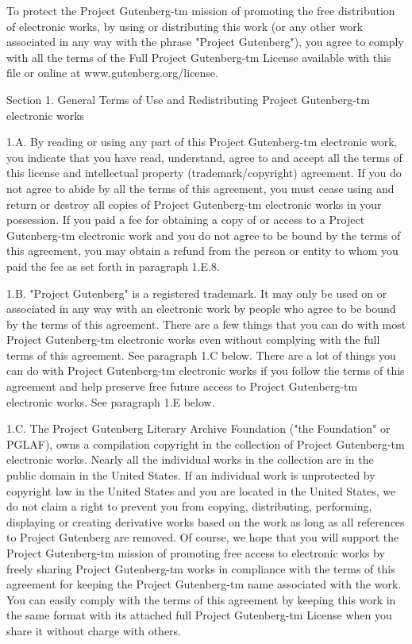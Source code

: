 To protect the Project Gutenberg-tm mission of promoting the free
distribution of electronic works, by using or distributing this work
(or any other work associated in any way with the phrase "Project
Gutenberg"), you agree to comply with all the terms of the Full
Project Gutenberg-tm License available with this file or online at
www.gutenberg.org/license.

Section 1. General Terms of Use and Redistributing Project
Gutenberg-tm electronic works

1.A. By reading or using any part of this Project Gutenberg-tm
electronic work, you indicate that you have read, understand, agree to
and accept all the terms of this license and intellectual property
(trademark/copyright) agreement. If you do not agree to abide by all
the terms of this agreement, you must cease using and return or
destroy all copies of Project Gutenberg-tm electronic works in your
possession. If you paid a fee for obtaining a copy of or access to a
Project Gutenberg-tm electronic work and you do not agree to be bound
by the terms of this agreement, you may obtain a refund from the
person or entity to whom you paid the fee as set forth in paragraph
1.E.8.

1.B. "Project Gutenberg" is a registered trademark. It may only be
used on or associated in any way with an electronic work by people who
agree to be bound by the terms of this agreement. There are a few
things that you can do with most Project Gutenberg-tm electronic works
even without complying with the full terms of this agreement. See
paragraph 1.C below. There are a lot of things you can do with Project
Gutenberg-tm electronic works if you follow the terms of this
agreement and help preserve free future access to Project Gutenberg-tm
electronic works. See paragraph 1.E below.

1.C. The Project Gutenberg Literary Archive Foundation ("the
Foundation" or PGLAF), owns a compilation copyright in the collection
of Project Gutenberg-tm electronic works. Nearly all the individual
works in the collection are in the public domain in the United
States. If an individual work is unprotected by copyright law in the
United States and you are located in the United States, we do not
claim a right to prevent you from copying, distributing, performing,
displaying or creating derivative works based on the work as long as
all references to Project Gutenberg are removed. Of course, we hope
that you will support the Project Gutenberg-tm mission of promoting
free access to electronic works by freely sharing Project Gutenberg-tm
works in compliance with the terms of this agreement for keeping the
Project Gutenberg-tm name associated with the work. You can easily
comply with the terms of this agreement by keeping this work in the
same format with its attached full Project Gutenberg-tm License when
you share it without charge with others.

